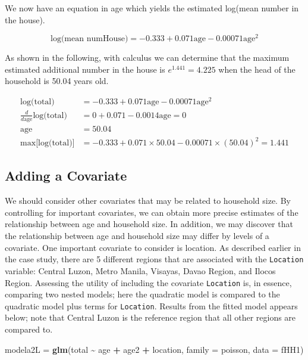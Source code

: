 \documentclass[
]{krantz}
\newenvironment{Shaded}{\begin{snugshade}}{\end{snugshade}}
\newcommand{\AttributeTok}[1]{\textcolor[rgb]{0.27,0.27,0.27}{#1}}
\newcommand{\FunctionTok}[1]{\textcolor[rgb]{0.27,0.27,0.27}{\textbf{#1}}}
\newcommand{\NormalTok}[1]{#1}
\newcommand{\OtherTok}[1]{\textcolor[rgb]{0.37,0.37,0.37}{#1}}
\newcommand{\SpecialCharTok}[1]{\textcolor[rgb]{0.43,0.43,0.43}{\textbf{#1}}}
\begin{document}
We now have an equation in age which yields the estimated log(mean number in the house).

\[\textrm{log(mean numHouse)} =  -0.333 + 0.071 \textrm{age} - 0.00071 \textrm{age}^2\]

As shown in the following, with calculus we can determine that the maximum estimated additional number in the house is \(e^{1.441} = 4.225\) when the head of the household is 50.04 years old.

\begin{align*}
\textrm{log(total)} & = -0.333 + 0.071\textrm{age} - 0.00071 \textrm{age}^2 \\
\frac{d}{d\textrm{age}}\textrm{log(total)} & = 0 + 0.071 - 0.0014 \textrm{age} = 0 \\
\textrm{age} & = 50.04 \\
\textrm{max[log(total)]} & = -0.333 + 0.071 \times 50.04 - 0.00071 \times (50.04)^2 = 1.441
\end{align*}

\subsection{Adding a Covariate}\label{adding-a-covariate}

We should consider other covariates that may be related to household size. By controlling for important covariates, we can obtain more precise estimates of the relationship between age and household size. In addition, we may discover that the relationship between age and household size may differ by levels of a covariate. One important covariate to consider is location. As described earlier in the case study, there are 5 different regions that are associated with the \texttt{Location} variable: Central Luzon, Metro Manila, Visayas, Davao Region, and Ilocos Region. Assessing the utility of including the covariate \texttt{Location} is, in essence, comparing two nested models; here the quadratic model is compared to the quadratic model plus terms for \texttt{Location}. Results from the fitted model appears below; note that Central Luzon is the reference region that all other regions are compared to.

\begin{Shaded}
\begin{Highlighting}[]
\NormalTok{modela2L }\OtherTok{=} \FunctionTok{glm}\NormalTok{(total }\SpecialCharTok{\textasciitilde{}}\NormalTok{ age }\SpecialCharTok{+}\NormalTok{ age2 }\SpecialCharTok{+}\NormalTok{ location, }
               \AttributeTok{family =}\NormalTok{ poisson, }\AttributeTok{data =}\NormalTok{ fHH1)}
\end{Highlighting}
\end{Shaded}
\end{document}
